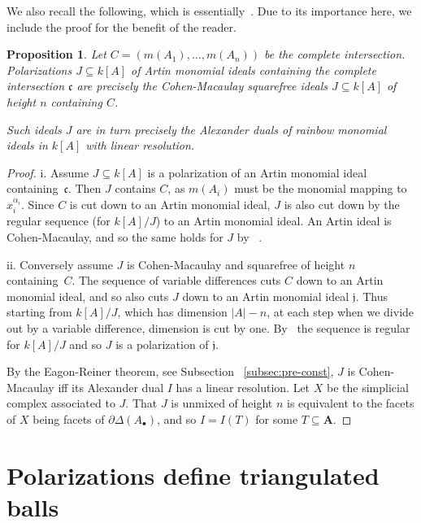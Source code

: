 \documentclass[10pt,a4paper]{article}
\newtheorem{prop}[cdrthm]{Proposition}
\theoremstyle{definition}
\theoremstyle{remark}
\theoremstyle{plain}
\newcommand{\vardel}{\partial}
\newcommand{\sus}{\subseteq}
\newcommand{\ic}{{\mathfrak c}}
\newcommand{\ijfr}{{\mathfrak j}}
\newcommand{\Ab}{A_\bullet}
\newcommand{\bfA}{{\mathbf A}}
\newcommand{\al}{{\alpha}}
\newcommand{\Delst}{\vardel \Delta}
\begin{document}
  We also recall the following, which is essentially~\cite[Prop.3.6]{AFL}.
  Due to its importance here,
  we include the proof for the benefit of the reader.
  
\begin{prop} \label{pro:pol-cm}
  Let $C = (m(A_1), \ldots, m(A_n))$ be the complete intersection.
  Polarizations $J \sus k[A]$ of Artin monomial ideals containing the complete
  intersection $\ic$
  are precisely the Cohen-Macaulay
  squarefree ideals $J \sus k[A]$ of height $n$  containing  $C$.

  Such ideals $J$ are in turn precisely 
    the Alexander duals of rainbow monomial ideals in $k[A]$ with
    linear resolution.
    \end{prop}

    \begin{proof} 
      i. Assume $J \subseteq k[A]$ is a polarization of an Artin
      monomial ideal containing~$\ic$. Then $J$ contains $C$, as
      $m(A_i)$ must be the monomial mapping to $x_i^{\al_i}$.
      Since $C$ is cut down to an Artin monomial ideal, $J$ is also cut
      down by the regular sequence (for $k[A]/J$) to an Artin monomial ideal.
      An Artin ideal is Cohen-Macaulay, and so the same holds for $J$ by
     ~\cite[Thm.~2.1.3.a]{BH93}.

      ii. Conversely assume $J$ is Cohen-Macaulay and squarefree of height $n$
      containing~$C$. The sequence
      of variable differences cuts $C$ down to an Artin monomial ideal,
      and so also cuts $J$ down to an Artin monomial ideal $\ijfr$. Thus
      starting from $k[A]/J$, which has dimension $|A|-n$, 
      at each step when we divide out by a variable difference,
      dimension is cut by one. By~\cite[Thm.~2.1.2.c]{BH93}
      the sequence is regular for $k[A]/J$ 
      and so $J$ is a polarization of $\ijfr$. 
      
      By the Eagon-Reiner theorem, see Subsection
     ~\ref{subsec:pre-const},
      $J$ is Cohen-Macaulay iff its Alexander dual $I$ has a linear resolution.
      Let $X$ be the simplicial complex associated to $J$. That $J$ is
      unmixed of height $n$ is equivalent to  the facets of $X$ being
      facets of $\Delst(\Ab)$, and so $I = I(T)$ for some $T \sus \bfA$.
    \end{proof}

\setcounter{section}{3}\setcounter{subsection}{0}

\section{Polarizations define triangulated balls}
\label{sec:polball}
\end{document}
